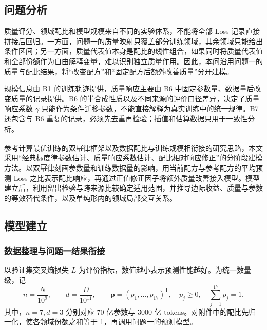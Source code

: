 \documentclass[bwprint]{gmcmthesis}
\begin{document}
    \subsection{问题分析}
    质量评分、领域配比和模型规模来自不同的实验体系，不能将全部 Loss 记录直接拼接后回归。一方面，问题一的质量映射只覆盖部分训练领域，其余领域只能给出条件区间；另一方面，质量代表值本身是配比的线性组合，如果同时将质量代表值和全部份额作为自由解释变量，难以识别独立质量作用。因此，本问沿用问题一的质量与配比结果，将“改变配方”和“固定配方后额外改善质量”分开建模。

    规模信息由 B1 的训练轨迹提供，质量响应主要由 B6 中固定参数量、数据量后改变质量的记录提供。B6 的半合成性质以及不同来源的评价口径差异，决定了质量响应系数 $\gamma$ 只能作为条件迁移参数，不能直接解释为真实训练中的统一规律。B7 还包含与 B6 重复的记录，必须先去重再检验；插值和估算数据只用于一致性分析。

    参考计算最优训练的双幂律框架\textsuperscript{\cite{hoffmann2022chinchilla}}以及数据配比与训练规模相衔接的研究思路\textsuperscript{\cite{ye2025mixing}}，本文采用“经典标度律参数估计、质量响应系数估计、配比相对响应修正”的分阶段建模方法。以双幂律刻画参数量和训练数据量的影响，用当前配方与参考配方的平均预测 Loss 之比表示配比响应，再通过正值修正因子将额外质量改善接入模型。模型建立后，利用留出检验与跨来源比较确定适用范围，并推导边际收益、质量与参数的等效替代条件，以及单纯形内的领域局部交互关系。

    \subsection{模型建立}
        \subsubsection{数据整理与问题一结果衔接}  %
        以验证集交叉熵损失 $L$ 为评价指标，数值越小表示预测性能越好。为统一数量级，记
        \begin{equation}
         n=\frac{N}{10^9},\qquad d=\frac{D}{10^{11}},\qquad
         \bm p=(p_1,\ldots,p_{17})^\mathsf T,\quad
         p_j\geq0,\quad\sum_{j=1}^{17}p_j=1.
         \label{eq:p2_units}
        \end{equation}
        其中，$n=7,d=3$ 分别对应 70 亿参数与 3000 亿 tokens。对附件中的配比先归一化，使各领域份额之和等于 1，再调用问题一的预测模型。
        
\end{document}
